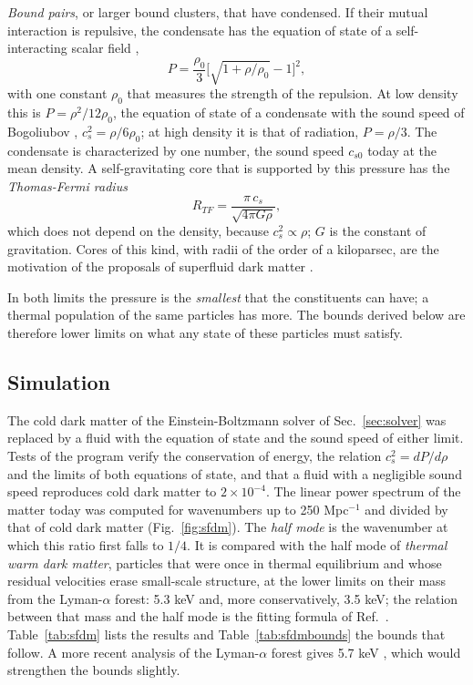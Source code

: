 \emph{Bound pairs}, or larger bound clusters, that have condensed. If their mutual interaction is
repulsive, the condensate has the equation of state of a self-interacting scalar field
\cite{ColpiShapiroWasserman1986,LiRindlerDallerShapiro2014},
\begin{equation}
P=\frac{\rho_0}{3}\Big[\sqrt{1+\rho/\rho_0}-1\Big]^2,
\label{eq:csw}
\end{equation}
with one constant $\rho_0$ that measures the strength of the repulsion. At low density this is
$P=\rho^2/12\rho_0$, the equation of state of a condensate with the sound speed of Bogoliubov
\cite{Bogoliubov1947}, $c_s^2=\rho/6\rho_0$; at high density it is that of radiation, $P=\rho/3$.
The condensate is characterized by one number, the sound speed $c_{s0}$ today at the mean density.
A self-gravitating core that is supported by this pressure has the \emph{Thomas-Fermi radius}
\begin{equation}
R_{TF}=\frac{\pi\,c_s}{\sqrt{4\pi G\rho}},
\label{eq:RTF}
\end{equation}
which does not depend on the density, because $c_s^2\propto\rho$; $G$ is the constant of
gravitation. Cores of this kind, with radii of the order of a kiloparsec, are the motivation of the
proposals of superfluid dark matter \cite{BerezhianiKhoury2015}.

In both limits the pressure is the \emph{smallest} that the constituents can have; a thermal
population of the same particles has more. The bounds derived below are therefore lower limits on
what any state of these particles must satisfy.

\subsection{Simulation}

The cold dark matter of the Einstein-Boltzmann solver of Sec.~\ref{sec:solver} was replaced by a
fluid with the equation of state and the sound speed of either limit. Tests of the program verify
the conservation of energy, the relation $c_s^2=dP/d\rho$ and the limits of both equations of state,
and that a fluid with a negligible sound speed reproduces cold dark matter to $2\times10^{-4}$. The
linear power spectrum of the matter today was computed for wavenumbers up to 250 Mpc$^{-1}$ and
divided by that of cold dark matter (Fig.~\ref{fig:sfdm}). The \emph{half mode} is the wavenumber at
which this ratio first falls to $1/4$. It is compared with the half mode of \emph{thermal warm dark
matter}, particles that were once in thermal equilibrium and whose residual velocities erase
small-scale structure, at the lower limits on their mass from the Lyman-$\alpha$ forest: 5.3 keV
\cite{Irsic2017} and, more conservatively, 3.5 keV; the relation between that mass and the half mode
is the fitting formula of Ref.~\cite{Viel2005}. Table~\ref{tab:sfdm} lists the results and
Table~\ref{tab:sfdmbounds} the bounds that follow. A more recent analysis of the Lyman-$\alpha$
forest gives 5.7 keV \cite{Irsic2024}, which would strengthen the bounds slightly.

